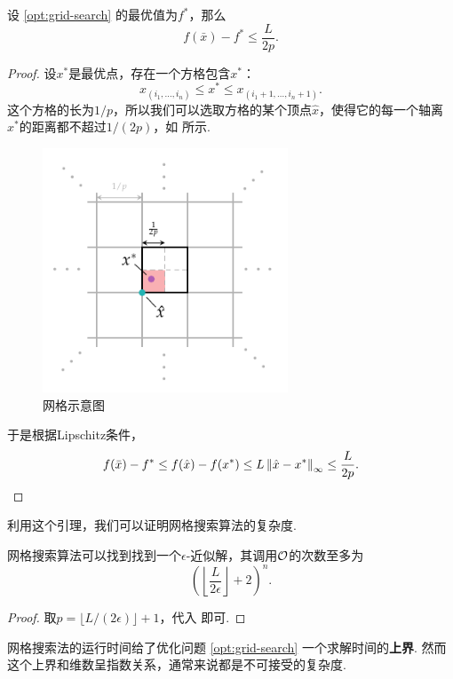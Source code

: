 \begin{lemma}\label{lemma:grid-search}
    设 \eqref{opt:grid-search} 的最优值为$f^*$，那么
\[f(\bar x)-f^*\leq\frac{L}{2p}.\]
\end{lemma}
\begin{proof}
设$x^*$是最优点，存在一个方格包含$x^*$：
\[x_{(i_1,\dots,i_n)}\leq x^*\leq x_{(i_1+1,\dots,i_n+1)}.\]
这个方格的长为$1/p$，所以我们可以选取方格的某个顶点$\hat x$，使得它的每一个轴离$x^*$的距离都不超过$1/(2p)$，如 所示. 

\begin{figure}[H]
    \centering
    \includegraphics[width=0.65\textwidth]{figures/convex-anlaysis/grid-partition.pdf}
    \caption{网格示意图}
    \label{fig:grid-partition}
\end{figure}

于是根据Lipschitz条件，
    \[f(\bar x)-f^*\leq f(\hat x)-f(x^*)\leq L\left\|\hat x- x^*\right\|_\infty\leq \frac{L}{2p}.\]
\end{proof}

利用这个引理，我们可以证明网格搜索算法的复杂度.
\begin{theorem}
    网格搜索算法可以找到找到一个$\epsilon$-近似解，其调用$\mathcal{O}$的次数至多为
    \[\left(\left\lfloor\frac{L}{2\epsilon}\right\rfloor+2\right)^n.\]
\end{theorem}
\begin{proof}
    取$p=\lfloor L/(2\epsilon)\rfloor+1$，代入 即可.
\end{proof}

网格搜索法的运行时间给了优化问题 \eqref{opt:grid-search} 一个求解时间的\textbf{上界}. 然而这个上界和维数呈指数关系，通常来说都是不可接受的复杂度. 

